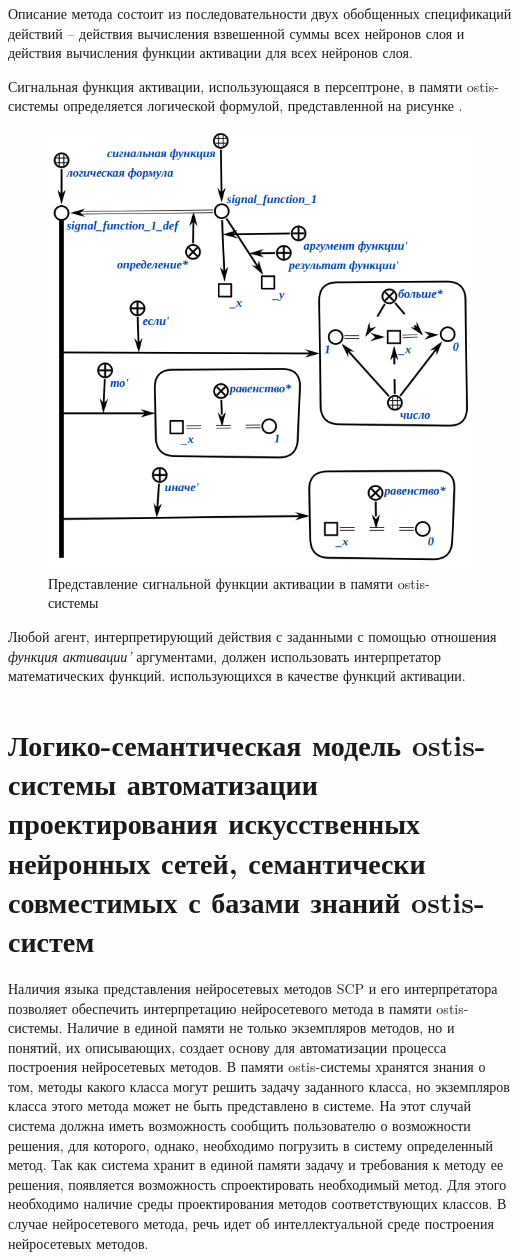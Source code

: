 Описание метода состоит из последовательности двух обобщенных спецификаций действий -- действия вычисления взвешенной суммы всех нейронов слоя и действия вычисления функции активации для всех нейронов слоя.

Сигнальная функция активации, использующаяся в персептроне, в памяти ostis-системы определяется логической формулой, представленной на рисунке \textit{}.

\begin{figure}
	\centering
	\includegraphics[width=0.5\linewidth]{author/part3/figures/signal_function_def.png}
	\caption{Представление сигнальной функции активации в памяти ostis-системы}
	\label{fig:signal_function_def}
\end{figure}

Любой агент, интерпретирующий действия с заданными с помощью отношения \textit{функция активации'} аргументами, должен использовать интерпретатор математических функций. использующихся в качестве функций активации.


\section{Логико-семантическая модель ostis-системы автоматизации проектирования искусственных нейронных сетей, семантически совместимых с базами знаний ostis-систем}
\label{sec_chapter_ann_framework}

Наличия языка представления нейросетевых методов SCP и его интерпретатора позволяет обеспечить интерпретацию нейросетевого метода в памяти ostis-системы. Наличие в единой памяти не только экземпляров методов, но и понятий, их описывающих, создает основу для автоматизации процесса построения нейросетевых методов. В памяти ostis-системы хранятся знания о том, методы какого класса могут решить задачу заданного класса, но экземпляров класса этого метода может не быть представлено в системе. На этот случай система должна иметь возможность сообщить пользователю о возможности решения, для которого, однако, необходимо погрузить в систему определенный метод. Так как система хранит в единой памяти задачу и требования к методу ее решения, появляется возможность спроектировать необходимый метод. Для этого необходимо наличие среды проектирования методов соответствующих классов. В случае нейросетевого метода, речь идет об интеллектуальной среде построения нейросетевых методов.


